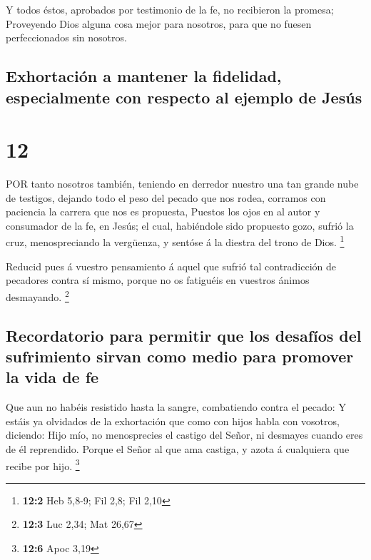  Y todos éstos, aprobados por testimonio de la fe, no
recibieron la promesa;  Proveyendo Dios alguna cosa mejor
para nosotros, para que no fuesen perfeccionados sin nosotros.

\hypertarget{exhortaciuxf3n-a-mantener-la-fidelidad-especialmente-con-respecto-al-ejemplo-de-jesuxfas}{%
\subsection{Exhortación a mantener la fidelidad, especialmente con
respecto al ejemplo de
Jesús}\label{exhortaciuxf3n-a-mantener-la-fidelidad-especialmente-con-respecto-al-ejemplo-de-jesuxfas}}

\hypertarget{section-11}{%
\section{12}\label{section-11}}

 POR tanto nosotros también, teniendo en derredor nuestro
una tan grande nube de testigos, dejando todo el peso del pecado que nos
rodea, corramos con paciencia la carrera que nos es propuesta,
 Puestos los ojos en al autor y consumador de la fe, en
Jesús; el cual, habiéndole sido propuesto gozo, sufrió la cruz,
menospreciando la vergüenza, y sentóse á la diestra del trono de Dios.
\footnote{\textbf{12:2} Heb 5,8-9; Fil 2,8; Fil 2,10}

 Reducid pues á vuestro pensamiento á aquel que sufrió tal
contradicción de pecadores contra sí mismo, porque no os fatiguéis en
vuestros ánimos desmayando. \footnote{\textbf{12:3} Luc 2,34; Mat 26,67}

\hypertarget{recordatorio-para-permitir-que-los-desafuxedos-del-sufrimiento-sirvan-como-medio-para-promover-la-vida-de-fe}{%
\subsection{Recordatorio para permitir que los desafíos del sufrimiento
sirvan como medio para promover la vida de
fe}\label{recordatorio-para-permitir-que-los-desafuxedos-del-sufrimiento-sirvan-como-medio-para-promover-la-vida-de-fe}}

 Que aun no habéis resistido hasta la sangre, combatiendo
contra el pecado:  Y estáis ya olvidados de la exhortación
que como con hijos habla con vosotros, diciendo: Hijo mío, no
menosprecies el castigo del Señor, ni desmayes cuando eres de él
reprendido.  Porque el Señor al que ama castiga, y azota á
cualquiera que recibe por hijo. \footnote{\textbf{12:6} Apoc 3,19}

